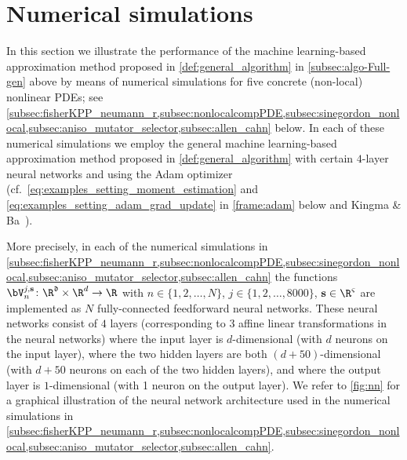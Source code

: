 \section{Numerical simulations}
\label{sec:examples}
In this section we illustrate the performance of the machine learning-based approximation method proposed in \cref{def:general_algorithm} in \cref{subsec:algo-Full-gen} above by means of numerical simulations for five concrete (non-local) nonlinear PDEs; see \cref{subsec:fisherKPP_neumann_r,subsec:nonlocalcompPDE,subsec:sinegordon_nonlocal,subsec:aniso_mutator_selector,subsec:allen_cahn} below. In each of these numerical simulations we employ the general machine learning-based approximation method proposed in \cref{def:general_algorithm} with certain $4$-layer neural networks and using the Adam optimizer (cf.\ \eqref{eq:examples_setting_moment_estimation} and \eqref{eq:examples_setting_adam_grad_update} in \cref{frame:adam} below and Kingma \& Ba~\citep{Kingma2014}).

More precisely, in each of the numerical simulations in \cref{subsec:fisherKPP_neumann_r,subsec:nonlocalcompPDE,subsec:sinegordon_nonlocal,subsec:aniso_mutator_selector,subsec:allen_cahn}
the functions 
$\bV^{j,\mathbf s}_n\colon \R^{\mathfrak d}\times\R^d\to\R$
with $ n \in \{ 1, 2, \dots, N\} $,
$ j \in \{ 1, 2, \dots, 8000 \} $,
$ \mathbf{s} \in \R^{\varsigma}$
are implemented as $N$
fully-connected feedforward neural networks.
%
These neural networks consist of
$ 4 $ layers (corresponding to 3 affine linear transformations in the neural networks) where
the input layer is $d$-dimensional (with $ d $ neurons on the input layer), where
the two hidden layers are both $(d+50)$-dimensional (with $d+50$ neurons on each of the two hidden layers), and where the output layer is $1$-dimensional (with 1 neuron on the output layer).
We refer to \cref{fig:nn} for a graphical illustration of the neural network architecture used in the numerical simulations in \cref{subsec:fisherKPP_neumann_r,subsec:nonlocalcompPDE,subsec:sinegordon_nonlocal,subsec:aniso_mutator_selector,subsec:allen_cahn}.

